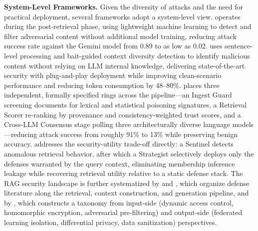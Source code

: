 \documentclass[11pt]{article}
\begin{document}
\textbf{System-Level Frameworks.} Given the diversity of attacks and the need for practical deployment, several frameworks adopt a system-level view. \cite{ref454} operates during the post-retrieval phase, using lightweight machine learning to detect and filter adversarial content without additional model training, reducing attack success rate against the Gemini model from 0.89 to as low as 0.02. \cite{ref455} uses sentence-level processing and bait-guided context diversity detection to identify malicious content without relying on LLM internal knowledge, delivering state-of-the-art security with plug-and-play deployment while improving clean-scenario performance and reducing token consumption by 48--80\%. \cite{ref456} places three independent, formally specified rings across the pipeline---an Ingest Guard screening documents for lexical and statistical poisoning signatures, a Retrieval Scorer re-ranking by provenance and consistency-weighted trust scores, and a Cross-LLM Consensus stage polling three architecturally diverse language models---reducing attack success from roughly 91\% to 13\% while preserving benign accuracy. \cite{ref457} addresses the security-utility trade-off directly: a Sentinel detects anomalous retrieval behavior, after which a Strategist selectively deploys only the defenses warranted by the query context, eliminating membership inference leakage while recovering retrieval utility relative to a static defense stack. The RAG security landscape is further systematized by \cite{ref423} and \cite{ref68}, which organize defense literature along the retrieval, context construction, and generation pipeline, and by \cite{ref75}, which constructs a taxonomy from input-side (dynamic access control, homomorphic encryption, adversarial pre-filtering) and output-side (federated learning isolation, differential privacy, data sanitization) perspectives.
\end{document}
